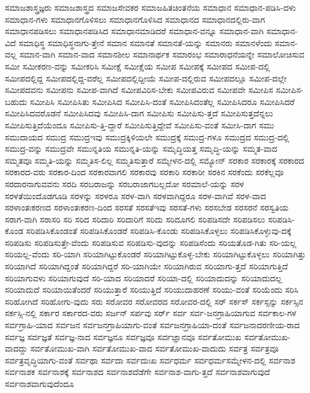 {ಸಮಾಜಶಾಸ್ತ್ರಜ್ಞರು
ಸಮಾಜಶಾಸ್ತ್ರದ
ಸಮಾಜಸೇವಕರ
ಸಮಾಜಹಿತಚಿಂತನೆಯ
ಸಮಾಧಾನ
ಸಮಾಧಾನ-ಪಡಿಸಿ-ದಳು
ಸಮಾಧಾನ-ಗಳು
ಸಮಾಧಾನಗೊಳಿಸಲು
ಸಮಾಧಾನಗೊಳಿಸಿದ
ಸಮಾಧಾನದ
ಸಮಾಧಾನದಲ್ಲಿರು-ವಾಗ
ಸಮಾಧಾನಪಡಿಸಲು
ಸಮಾಧಾನಪಡಿಸಿದ
ಸಮಾಧಾನಮಾಡಿದರೆ
ಸಮಾಧಾನ-ವನ್ನೂ
ಸಮಾಧಾನ-ವಾಗಿ
ಸಮಾಧಾನ-ವಿದೆ
ಸಮಾಧಿಸ್ಥ
ಸಮಾಧಿಸ್ಥನಾಗು-ತ್ತೇನೆ
ಸಮಾನ
ಸಮಾನತೆ
ಸಮಾನತೆ-ಯನ್ನು
ಸಮಾನರು
ಸಮಾನಳೆಂದು
ಸಮಾನ-ವಲ್ಲ
ಸಮಾನ-ವಾಗಿ
ಸಮಾನ-ವಾದ
ಸಮಾನಶೀಲ
ಸಮಾನಾರ್ಥಕ
ಸಮಾರಂಭ
ಸಮಾರಾಧನೆಯನ್ನೇ
ಸಮಾಲೋಚಿಸುವ
ಸಮೀ
ಸಮೀಕರಣ-ವನ್ನು
ಸಮೀಕರಿಸಿ
ಸಮೀಕ್ಷೆ
ಸಮೀಕ್ಷೆಯ
ಸಮೀಪ
ಸಮೀಪಕ್ಕೆ
ಸಮೀಪದ
ಸಮೀಪ-ದಲ್ಲಿ
ಸಮೀಪದಲ್ಲಿದ್ದ
ಸಮೀಪದಲ್ಲಿದ್ದ-ವರೆಲ್ಲ
ಸಮೀಪದಲ್ಲಿದ್ದೀಯೆ
ಸಮೀಪ-ದಲ್ಲಿರುವ
ಸಮೀಪದಲ್ಲೂ
ಸಮೀಪ-ದಲ್ಲೇ
ಸಮೀಪದವನು
ಸಮೀಪನು
ಸಮೀಪ-ವಾಗಿದೆ
ಸಮೀಪವಿರಿಸ-ಬೇಕು
ಸಮೀಪವಿರುವ
ಸಮೀಪವೇ
ಸಮೀಪಿಸ
ಸಮೀಪಿಸ-ಬಹುದು
ಸಮೀಪಿಸಿ
ಸಮೀಪಿಸಿತು
ಸಮೀಪಿಸಿದ
ಸಮೀಪಿಸಿ-ದಂತೆ
ಸಮೀಪಿಸಿದಂತೆಲ್ಲ
ಸಮೀಪಿಸಿದರೂ
ಸಮೀಪಿಸಿದರೆ
ಸಮೀಪಿಸಿದವರೊಡನೆ
ಸಮೀಪಿಸಿದವು
ಸಮೀಪಿಸಿ-ದಾಗ
ಸಮೀಪಿಸು
ಸಮೀಪಿಸು-ತ್ತದೆ
ಸಮೀಪಿಸುತ್ತದೆನ್ನಲು
ಸಮೀಪಿಸುತ್ತಿದೆಯೆಂದೂ
ಸಮೀಪಿಸು-ತ್ತಿ-ದ್ದಾರೆ
ಸಮೀಪಿಸುತ್ತಿದ್ದೇವೆ
ಸಮೀಪಿಸು-ವಂತೆ
ಸಮೀಸಿ-ದಾಗ
ಸಮು
ಸಮುದಾಯದ
ಸಮುದ್ರ
ಸಮುದ್ರಇವು
ಸಮುದ್ರಕ್ಕಿಳಿಯಲೇ
ಸಮುದ್ರಕ್ಕೆ
ಸಮುದ್ರ-ಗಳೂ
ಸಮುದ್ರದ
ಸಮುದ್ರ-ದಲ್ಲಿ
ಸಮುದ್ರ-ವನ್ನು
ಸಮುದ್ರವೇ
ಸಮುನ್ನತಿಯ
ಸಮುನ್ನತಿ-ಯನ್ನು
ಸಮೃದ್ಧಿಯತ್ತ
ಸಮೃದ್ಧಿ-ಯನ್ನು
ಸಮ್ಮತ-ವಾದ
ಸಮ್ಮತವೂ
ಸಮ್ಮತಿ-ಯನ್ನು
ಸಮ್ಮತಿಸ-ಲಿಲ್ಲ
ಸಮ್ಮತಿಸುತ್ತಾರೆ
ಸಮ್ಮೇಳನ-ದಲ್ಲಿ
ಸಮ್ಯೋನ್
ಸರಕಾರ
ಸರಕಾರಕ್ಕೆ
ಸರಕಾರದ
ಸರಕಾರದ-ವರು
ಸರಕಾರ-ದಿಂದ
ಸರಕಾರವಾಗಲಿ
ಸರಕಾರವು
ಸರಕಾರಿ
ಸರಕಾರೀ
ಸರಕಿನ
ಸರಕೆಂದು
ಸರಕೆಲ್ಲವೂ
ಸರದಾರನಾಗುವವನು
ಸರದಿ
ಸರಬರಾಜನ್ನು
ಸರಬರಾಜಾಗಬಲ್ಲದೋ
ಸರಮಾಲೆ-ಯನ್ನು
ಸರಳ
ಸರಳತೆಯಿಂದೊಡಗೂಡಿ
ಸರಳನ್ನು
ಸರಳರೂ
ಸರಳ-ವಾಗಿ
ಸರಳವಾಗಿದ್ದರೂ
ಸರಳ-ವಾಗಿವೆ
ಸರಳ-ವಾದ
ಸರಳಾಂತಃಕರಣದ
ಸರಳಾಂತಃಕರಣ-ದಿಂದ
ಸರಸತೆ
ಸರಸತೆಇವು
ಸರಸತೆ-ಗಳು
ಸರಸಬೇಡ
ಸರಸರನೆ
ಸರಸ್ವತಿಯ
ಸರಾಗ-ವಾಗಿ
ಸರಾಸರಿ
ಸರಿ
ಸರಿದ
ಸರಿದಾರಿ
ಸರಿದಾರಿಗೆ
ಸರಿದು
ಸರಿದೂಗಲಿ
ಸರಿಪಡಿಸದೇ
ಸರಿಪಡಿಸಲು
ಸರಿಪಡಿಸಿ-ಕೊಂಡ
ಸರಿಪಡಿಸಿಕೊಂಡಂತೆ
ಸರಿಪಡಿಸಿಕೊಂಡರೆ
ಸರಿಪಡಿಸಿ-ಕೊಂಡು
ಸರಿಪಡಿಸಿಕೊಳ್ಳಲು
ಸರಿಪಡಿಸಿಕೊಳ್ಳುವು-ದಕ್ಕೆ
ಸರಿಪಡಿಸು
ಸರಿಪಡಿಸುತ್ತೇ-ವೆಂದು
ಸರಿಪಡಿಸುವ
ಸರಿಪಡಿಸು-ವುದನ್ನು
ಸರಿಪಡಿಸೆಂದು
ಸರಿಯತೊಡ-ಗಿತು
ಸರಿ-ಯಲ್ಲ
ಸರಿಯಲ್ಲ-ವೆಂದು
ಸರಿ-ಯಾಗಿ
ಸರಿಯಾಗಿಟ್ಟುಕೊಂಡರೆ
ಸರಿಯಾಗಿಟ್ಟುಕೊಳ್ಳ-ಬೇಕು
ಸರಿಯಾಗಿಟ್ಟುಕೊಳ್ಳಲು
ಸರಿಯಾಗಿತ್ತು
ಸರಿಯಾಗಿದೆ
ಸರಿಯಾಗಿದ್ದಂತೆ
ಸರಿಯಾಗಿದ್ದರೆ
ಸರಿ-ಯಾಗಿಯೇ
ಸರಿಯಾಗಿರುವ
ಸರಿಯಾಗು-ತ್ತದೆ
ಸರಿಯಾಗುತ್ತಿದೆ
ಸರಿಯಾಗುವಳು
ಸರಿಯಾಗುವುದೆ
ಸರಿ-ಯಾದ
ಸರಿಯಾದರೆ
ಸರಿಯಾ-ದಲ್ಲಿ
ಸರಿಯಾದುದನ್ನು
ಸರಿಯಾದುದಲ್ಲ
ಸರಿಯಾದುದೆ
ಸರಿಯಾಯಿತೆಂದರೆ
ಸರಿಯುತ್ತಾರೆ
ಸರಿಯುತ್ತಿದೆ
ಸರಿಯುದಾಹರಣೆ
ಸರಿಯು-ವಂತೆ
ಸರಿಯೆಂದು
ಸರಿಸಿ
ಸರಿಹೋಗಿದೆ
ಸರಿಹೋಗು-ವುದು
ಸರು
ಸರೋವರ
ಸರೋವರದ
ಸರೋವರ-ದಲ್ಲಿ
ಸರ್
ಸರ್ಕಸ್
ಸರ್ಕಸ್ಸನ್ನು
ಸರ್ಕಸ್ಸಿನ
ಸರ್ಕಸ್ಸಿ-ನಲ್ಲಿ
ಸರ್ಕಾರ
ಸರ್ಕಾರದ-ವರು
ಸರ್ಜನ್
ಸರ್ಪವು
ಸರ್ರ್
ಸರ್ವ
ಸರ್ವ-ಜನಗ್ರಾಹಿಯಾಗುವ
ಸರ್ವಕಾಲ-ಗಳ
ಸರ್ವಗ್ರಾಹಿ-ಯಾದ
ಸರ್ವಜನ
ಸರ್ವಜನಗ್ರಾಹಿಯಾಗು-ವಂತೆ
ಸರ್ವಜನಗ್ರಾಹಿಯಾ-ದಂತೆ
ಸರ್ವಜನಾದರಣೀಯ-ರಾದ
ಸರ್ವಜ್ಞ
ಸರ್ವಜ್ಞತೆ
ಸರ್ವಜ್ಞ-ನಾದ
ಸರ್ವಜ್ಞನೂ
ಸರ್ವಜ್ಞವೂ
ಸರ್ವಜ್ಞಾನವೂ
ಸರ್ವತೋಮುಖ
ಸರ್ವತೋಮುಖ-ವಾದದ್ದು
ಸರ್ವತೋಮುಖ-ವಾಗಿ
ಸರ್ವತೋಮುಖ-ವಾದ
ಸರ್ವತೋಮುಖ-ವಾದುದು
ಸರ್ವತ್ರ
ಸರ್ವತ್ರವೂ
ಸರ್ವತ್ರವೃದ್ಧಿಯಾಗು-ವಂತೆ
ಸರ್ವಥಾ
ಸರ್ವದಾ
ಸರ್ವದುಃಖ
ಸರ್ವಧರ್ಮ
ಸರ್ವಧರ್ಮಸಮ್ಮೇಳನ-ದಲ್ಲಿ
ಸರ್ವನಾಶ
ಸರ್ವನಾಶಕ
ಸರ್ವನಾಶಕ್ಕೆ
ಸರ್ವನಾಶದ
ಸರ್ವನಾಶದೆಡೆಗೇ
ಸರ್ವನಾಶ-ವಾಗು-ತ್ತದೆ
ಸರ್ವನಾಶವಾಗುವುದೆ
ಸರ್ವನಾಶವಾಗುವುದೆಂದೂ
}
